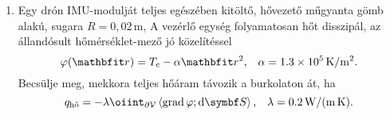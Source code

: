 \documentclass{szb-practice}
\begin{document}
\begin{enumerate}
  \item Egy drón IMU-modulját teljes egészében kitöltő, hővezető műgyanta gömb
        alakú, sugara $R = 0,02 \, \text{m}$, A vezérlő egység folyamatosan
        hőt disszipál, az állandósult hő\-mér\-sék\-let-mező jó közelítéssel
        $$
          \varphi(\coordv) = T_c - \alpha \rvec r^2
          \text, \quad
          \alpha = \SI[per-mode=symbol]{1,3e5}{\kelvin\per\meter\squared}
          \text.
        $$
        Becsülje meg, mekkora teljes hőáram távozik a burkolaton át, ha
        $$
          q_{\text{hő}}
          = -\lambda \oiint_{\partial \volimage} \scalar{\grad \varphi}{\dd \surfvec}
          \text,\quad
          \lambda = \SI[per-mode=symbol]{0,2}{\watt\per\meter\per\kelvin}
          \text.
        $$
\end{enumerate}


\end{document}

